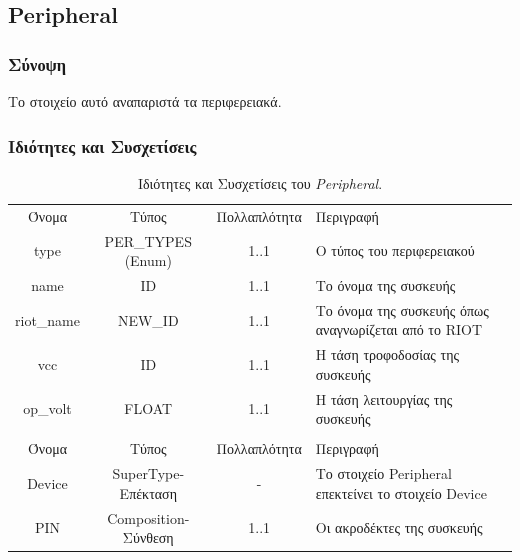 \subsection{Peripheral}
\label{subsec:peripheral}

\subsubsection*{Σύνοψη}

\noindent Το στοιχείο αυτό αναπαριστά τα περιφερειακά.

\subsubsection*{Ιδιότητες και Συσχετίσεις}

\begin{table}[H]
	\begin{center}
		\begin{tabular}{ | c | c | c| m{5.5cm} | }
			\hline
			\rowcolor{Gray}
			\multicolumn{4}{|c|}{\textbf{Ιδιότητες}}\\
			\hline
			\rowcolor{Gray}
			Όνομα & Τύπος & Πολλαπλότητα & Περιγραφή \\
			\hline
			type & PER\_TYPES (Enum) & 1..1 &  Ο τύπος του περιφερειακού \\
			\hline
			name & ID & 1..1 &  Το όνομα της συσκευής \\
			\hline
			riot\_name & NEW\_ID & 1..1 &  Το όνομα της συσκευής όπως αναγνωρίζεται από το RIOT \\
			\hline
			vcc & ID & 1..1 & Η τάση τροφοδοσίας της συσκευής \\
			\hline
			op\_volt & FLOAT & 1..1 &  Η τάση λειτουργίας της συσκευής \\
			\hline
			\rowcolor{Gray}
			\multicolumn{4}{|c|}{\textbf{Συσχετίσεις}}\\
			\hline
			\rowcolor{Gray}
			Όνομα & Τύπος & Πολλαπλότητα & Περιγραφή \\
			\hline
			Device & SuperType-Επέκταση & - &  Το στοιχείο Peripheral επεκτείνει το στοιχείο Device \\
			\hline
			PIN & Composition-Σύνθεση & 1..1 &  Οι ακροδέκτες της συσκευής \\
			\hline
		\end{tabular}
		\caption{Ιδιότητες και Συσχετίσεις του \textit{Peripheral}.}
		\label{tab:peripheral}
	\end{center}
\end{table}

